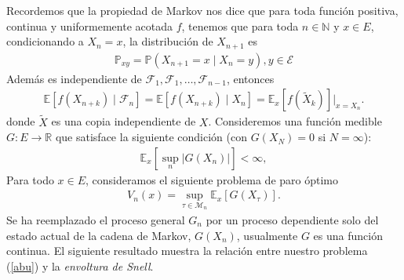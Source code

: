 Recordemos que la propiedad de Markov nos dice que para toda función positiva, continua y uniformemente acotada $f$, tenemos que para toda $n \in \mathbb{N}$ y $x \in E$, condicionando a $X_n = x$, la distribución de $X_{n+1}$ es
	\begin{align*}
	\mathbb{P}_{xy} = \mathbb{P}(X_{n+1} = x \mid X_n = y), y \in \mathcal{E}
	\end{align*}
Además es independiente de $\mathcal{F}_1, \mathcal{F}_1, \ldots, \mathcal{F}_{n-1}$, entonces 
	\begin{align*}
	\mathbb{E}[f(X_{n+k}) \mid \mathcal{F}_n] = \mathbb{E}[f(X_{n+k}) \mid X_n] = \mathbb{E}_x [f(\tilde{X}_k)] \bigg|_{x = X_n}.
	\end{align*}
donde $\tilde{X}$ es una copia independiente de $X$. Consideremos una función medible $G : E \rightarrow \mathbb{R}$ que satisface la siguiente condición (con $G(X_N) = 0$ si $N = \infty$):
	\begin{align*}
	\mathbb{E}_x \left[ \sup_n |G(X_n)| \right] < \infty,
	\end{align*}
Para todo $x \in E$, consideramos el siguiente problema de paro óptimo
	\begin{align}
	V_n (x) = \sup_{\tau \in \mathcal{M}_n} \mathbb{E}_x [G(X_\tau)]. \label{abu}
	\end{align}
Se ha reemplazado el proceso general $G_n$  por un proceso dependiente solo del estado actual de la cadena de Markov, $G(X_n)$, usualmente $G$ es una función continua. El siguiente resultado muestra la relación entre nuestro problema (\ref{abu}) y la \emph{envoltura de Snell}.

